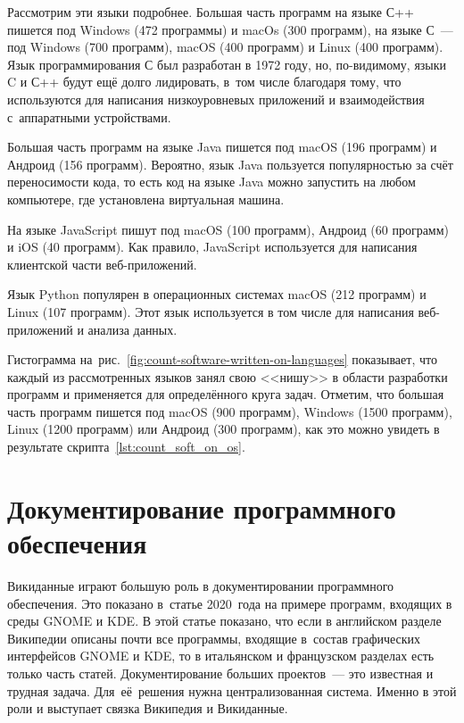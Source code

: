 Рассмотрим эти языки подробнее. 
Большая часть программ на языке С++ пишется под Windows (472 программы) и macOs (300 программ), 
на языке С~--- под Windows (700 программ), macOS (400 программ) и Linux (400 программ). 
Язык программирования С был разработан в 1972 году, 
но, по-видимому, языки C и С++ будут ещё долго лидировать, 
в~том числе благодаря тому, что используются для написания низкоуровневых приложений 
и взаимодействия с~аппаратными устройствами\autocite{FutureProgrLang2016}.

Большая часть программ на языке Java пишется под macOS (196 программ) и Андроид (156 программ). 
Вероятно, язык Java пользуется популярностью 
за счёт переносимости кода, 
то есть код на языке Java можно запустить на любом компьютере, 
где установлена виртуальная машина. 

На языке JavaScript пишут под macOS (100 программ), 
Андроид (60 программ) и iOS (40 программ). Как правило, 
JavaScript используется для написания клиентской части веб-приложений.

Язык Python популярен в операционных системах macOS (212 программ) и Linux (107 программ). 
Этот язык используется в том числе для написания веб-приложений и анализа данных.

Гистограмма на~рис.~\ref{fig:count-software-written-on-languages} показывает, 
что каждый из рассмотренных языков занял свою <<нишу>> в области разработки программ 
и применяется для определённого круга задач. 
Отметим, что большая часть программ пишется под macOS (900 программ), Windows (1500 программ), Linux (1200 программ) или Андроид (300 программ), как это можно увидеть в результате скрипта~\ref{lst:count_soft_on_os}.




\newpage
\section{Документирование программного обеспечения}
Викиданные играют большую роль в документировании программного обеспечения. 
Это показано в~статье 2020~года\autocite{Samuel2020DocumentingWiki} на примере программ, входящих в среды GNOME и KDE. 
В этой статье показано, что если в английском разделе Википедии описаны почти все программы, 
входящие в~состав графических интерфейсов GNOME и KDE, 
то в итальянском и французском разделах есть только часть статей. 
Документирование больших проектов~--- это известная и трудная задача. 
Для~её~решения нужна централизованная система. 
Именно в этой роли и выступает связка Википедия и Викиданные\autocite{Samuel2020DocumentingWiki}.


